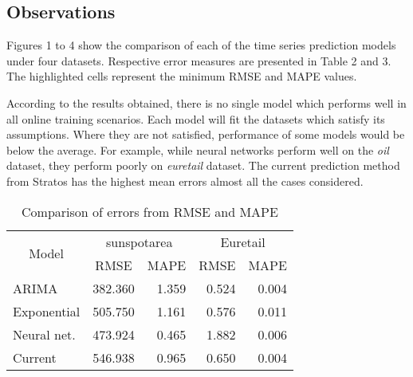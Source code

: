 \subsection{Observations}

Figures 1 to 4 show the comparison of each of the time series prediction models under four datasets. Respective error measures are presented in Table 2 and 3. The highlighted cells represent the minimum RMSE and MAPE values. 

According to the results obtained, there is no single model which performs well in all online training scenarios. Each model will fit the datasets which satisfy its assumptions. Where they are not satisfied, performance of some models would be below the average. For example, while neural networks perform well on the \textit{oil} dataset, they perform poorly on \textit{euretail} dataset. The current prediction method from Stratos has the highest mean errors almost all the cases considered.

\begin{table}[]
\centering
\caption{Comparison of errors from RMSE and MAPE}
\begin{tabular}{|l|l|r|r|r|}
\hline
\multicolumn{1}{|c|}{\multirow{2}{*}{Model}} & \multicolumn{2}{c|}{sunspotarea}                     & \multicolumn{2}{c|}{Euretail}                        \\ \cline{2-5}
\multicolumn{1}{|c|}{}                       & \multicolumn{1}{c|}{RMSE} & \multicolumn{1}{c|}{MAPE} & \multicolumn{1}{c|}{RMSE} & \multicolumn{1}{c|}{MAPE} \\ \hline
ARIMA                                        & 382.360                & 1.359                   & 0.524                  & 0.004                   \\ \hline
Exponential                                  & 505.750                & 1.161                   & 0.576                  & 0.011                   \\ \hline
Neural net.                                  & 473.924                & 0.465                   & 1.882                  & 0.006                   \\ \hline
Current                                      & 546.938                & 0.965                   & 0.650                  & 0.004                   \\ \hline
\end{tabular}
\end{table}

